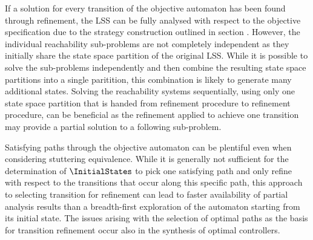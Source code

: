     If a solution for every transition of the objective automaton has been found through refinement, the LSS can be fully analysed with respect to the objective specification due to the strategy construction outlined in section .
    However, the individual reachability sub-problems are not completely independent as they initially share the state space partition of the original LSS.
    While it is possible to solve the sub-problems independently and then combine the resulting state space partitions into a single paritition, this combination is likely to generate many additional states.
    Solving the reachability systems sequentially, using only one state space partition that is handed from refinement procedure to refinement procedure, can be beneficial as the refinement applied to achieve one transition may provide a partial solution to a following sub-problem.

    Satisfying paths through the objective automaton can be plentiful even when considering stuttering equivalence.
    While it is generally not sufficient for the determination of $\InitialStates$ to pick one satisfying path and only refine with respect to the transitions that occur along this specific path, this approach to selecting transition for refinement can lead to faster availability of partial analysis results than a breadth-first exploration of the automaton starting from its initial state.
    The issues arising with the selection of optimal paths as the basis for transition refinement occur also in the synthesis of optimal controllers.

\stopsubsection

